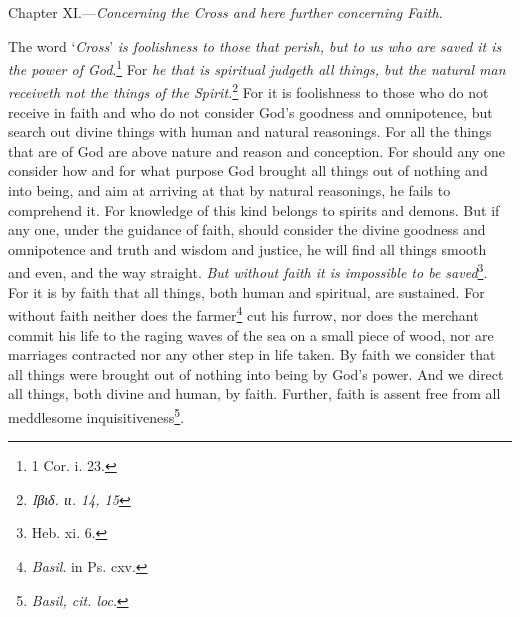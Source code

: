 
Chapter XI.—\emph{Concerning the Cross and here further concerning Faith.}

The word ‘\emph{Cross}’ \emph{is foolishness to those that perish, but to us who are saved it is the power of God}.\footnote{1 Cor. i. 23.} For \emph{he that is spiritual judgeth all things, but the natural man receiveth not the things of the Spirit.}\footnote{\emph{\textgreek{Ιβιδ}. ιι. 14, 15}} For it is foolishness to those who do not receive in faith and who do not consider God’s goodness and omnipotence, but search out divine things with human and natural reasonings. For all the things that are of God are above nature and reason and conception. For should any one consider how and for what purpose God brought all things out of nothing and into being, and aim at arriving at that by natural reasonings, he fails to comprehend it. For knowledge of this kind belongs to spirits and demons. But if any one, under the guidance of faith, should consider the divine goodness and omnipotence and truth and wisdom and justice, he will find all things smooth and even, and the way straight. \emph{But without faith it is impossible to be saved}\footnote{Heb. xi. 6.}. For it is by faith that all things, both human and spiritual, are sustained. For without faith neither does the farmer\footnote{\emph{Basil}. in Ps. cxv.} cut his furrow, nor does the merchant commit his life to the raging waves of the sea on a small piece of wood, nor are marriages contracted nor any other step in life taken. By faith we consider that all things were brought out of nothing into being by God’s power. And we direct all things, both divine and human, by faith. Further, faith is assent free from all meddlesome inquisitiveness\footnote{\emph{Basil, cit. loc}.}.

